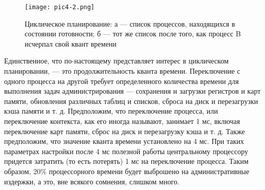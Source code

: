 \begin{figure}[!h]\center
   \texttt{[image: pic4-2.png]}
   \caption{Циклическое планирование: а — список процессов, находящихся в состоянии
      готовности; б — тот же список после того, как процесс B исчерпал свой квант времени}
\end{figure}

Единственное, что по-настоящему представляет интерес в циклическом планировании, — это продолжительность кванта времени. Переключение с одного процесса на другой требует определенного количества времени для выполнения задач администрирования — сохранения и загрузки регистров и карт памяти, обновления различных таблиц и списков, сброса на диск и перезагрузки кэша памяти и т. д. Предположим, что переключение процесса, или переключение контекста, как его иногда называют, занимает 1 мс, включая переключение карт памяти, сброс на диск и перезагрузку кэша и т. д. Также предположим, что значение кванта времени установлено на 4 мс. При таких параметрах настройки после 4 мс полезной работы центральному процессору придется затратить (то есть потерять) 1 мс на переключение процесса. Таким образом, 20\% процессорного времени будет выброшено на административные издержки, а это, вне всякого сомнения, слишком много.

